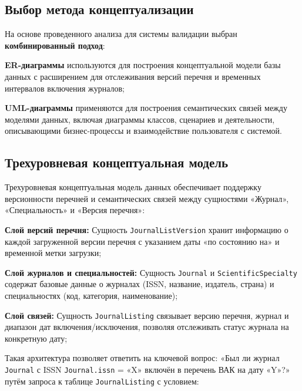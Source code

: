 \subsection{Выбор метода концептуализации}
На основе проведенного анализа для системы валидации выбран \textbf{комбинированный подход}:

\begin{compactenum}
	\item \textbf{ER-диаграммы} используются для построения концептуальной модели базы данных с
	расширением для отслеживания версий перечня и временных интервалов включения
	журналов;
	\item \textbf{UML-диаграммы} применяются для построения семантических связей между моделями данных,
	включая диаграммы классов, сценариев и деятельности, описывающими
	бизнес-процессы и взаимодействие пользователя с системой.
\end{compactenum}

\subsection*{Трехуровневая концептуальная модель}

Трехуровневая концептуальная модель данных обеспечивает поддержку версионности
перечней и семантических связей между сущностями «Журнал», «Специальность» и «Версия перечня»:

\begin{compactenum}
	\item \textbf{Слой версий перечня:} Сущность {\small\texttt{JournalListVersion}} хранит информацию 
	о каждой загруженной версии перечня с указанием даты «по состоянию на» и временной метки
	загрузки;
	\item \textbf{Слой журналов и специальностей:} Сущность {\small\texttt{Journal}} и {\small\texttt{ScientificSpecialty}} 
	содержат базовые данные о журналах (ISSN, название, издатель, страна) и специальностях 
	(код, категория, наименование);
	\item \textbf{Слой связей:} Сущность {\small\texttt{JournalListing}} связывает версию перечня, журнал и 
	диапазон дат включения/исключения, позволяя отслеживать статус журнала на конкретную дату;
\end{compactenum}

Такая архитектура позволяет ответить на ключевой вопрос: «Был ли журнал {\small\texttt{Journal}}
с ISSN {\small\texttt{Journal.issn}} = «X» включён в перечень ВАК на дату «Y»?» путём запроса к
таблице {\small\texttt{JournalListing}} с условием:

